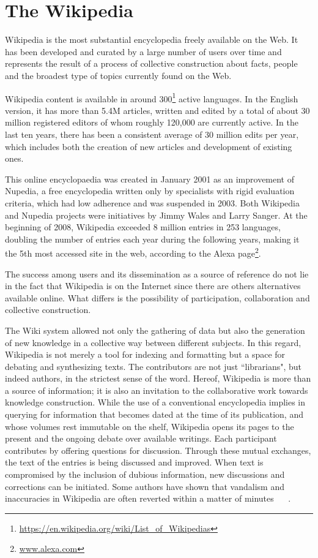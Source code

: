 \section{\hspace*{3pt} The Wikipedia}


Wikipedia is the most substantial encyclopedia freely available on the Web. It has been developed and curated by a large number of users over time and represents the result of a process of collective construction about facts, people and the broadest type of topics currently found on the Web.

Wikipedia content is available in around 300\footnote{\url{https://en.wikipedia.org/wiki/List_of_Wikipedias}} active languages. In the English version, it has more than 5.4M articles,  written and edited by a total of about 30 million registered editors of whom roughly 120,000 are currently active. In the last ten years, there has been a consistent average of 30 million edits per year, which includes both the creation of new articles and development of existing ones. 

This online encyclopaedia was created in January 2001 as an improvement of Nupedia, a free encyclopedia written only by specialists with rigid evaluation criteria, which had low adherence and was suspended in 2003.
Both Wikipedia and Nupedia projects were initiatives by Jimmy Wales and Larry Sanger. At the beginning of 2008, Wikipedia exceeded 8 million entries in 253 languages, doubling the number of entries each year during the following years, making it the 5th most accessed site in the web, according to the Alexa page\footnote{\url{www.alexa.com}}.

The success among users and its dissemination as a source of reference do not lie in the fact that Wikipedia is on the Internet since there are others alternatives available online. What differs is the possibility of participation, collaboration and collective construction. 


The Wiki system allowed not only the gathering of data but also the generation of new knowledge in a collective way between different subjects. In this regard, Wikipedia is not merely a tool for indexing and formatting but a space for debating and synthesizing texts. The contributors are not just ``librarians", but indeed authors, in the strictest sense of the word.  Hereof, Wikipedia is more than a source of information; it is also an invitation to the collaborative work towards knowledge construction. While the use of a conventional encyclopedia implies in querying for information that becomes dated at the time of its publication, and whose volumes rest immutable on the shelf, Wikipedia opens its pages to the present and the ongoing debate over available writings. Each participant contributes by offering questions for discussion. Through these mutual exchanges, the text of the entries is being discussed and improved. When text is compromised by the inclusion of dubious information, new discussions and corrections can be initiated.
Some authors have shown that vandalism and inaccuracies in Wikipedia are often reverted within a matter of minutes ~\cite{kittur2007he} ~\cite{viegas2004studying}.

